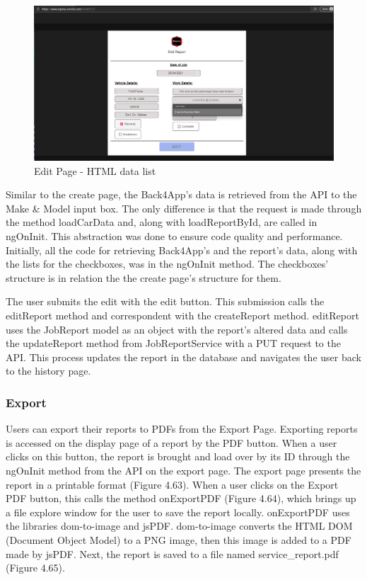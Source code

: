 \begin{figure}[H]
    \centering
    \caption{Edit Page - HTML data list}
    \label{image:EditHTMLdatalist}
    \includegraphics[width=1.0\textwidth]{images/repota/UI/edit-page.png}
\end{figure}

Similar to the create page, the Back4App's data is retrieved from the API to the Make \& Model input box. The only difference is that the request is made through the method loadCarData and, along with loadReportById, are called in ngOnInit. This abstraction was done to ensure code quality and performance. Initially, all the code for retrieving Back4App's and the report's data, along with the lists for the checkboxes, was in the ngOnInit method. The checkboxes' structure is in relation the the create page's structure for them.

The user submits the edit with the edit button. This submission calls the editReport method and correspondent with the createReport method. editReport uses the JobReport model as an object with the report's altered data and calls the updateReport method from JobReportService with a PUT request to the API. This process updates the report in the database and navigates the user back to the history page.

\subsubsection{Export}
Users can export their reports to PDFs from the Export Page. Exporting reports is accessed on the display page of a report by the PDF button. When a user clicks on this button, the report is brought and load over by its ID through the ngOnInit method from the API on the export page. The export page presents the report in a printable format (Figure 4.63). When a user clicks on the Export PDF button, this calls the method onExportPDF (Figure 4.64), which brings up a file explore window for the user to save the report locally. onExportPDF uses the libraries dom-to-image and jsPDF. dom-to-image converts the HTML DOM (Document Object Model) to a PNG image, then this image is added to a PDF made by jsPDF. Next, the report is saved to a file named service\_report.pdf (Figure 4.65).

